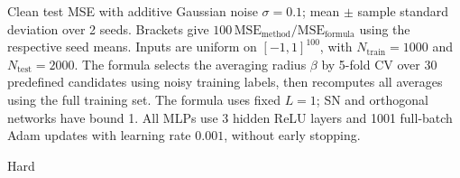 \begin{table}[t]
\centering
\footnotesize
\setlength{\tabcolsep}{3pt}
\caption{Clean test MSE with additive Gaussian noise $\sigma=0.1$; mean $\pm$ sample standard deviation over 2 seeds. Brackets give $100\,\mathrm{MSE}_{\mathrm{method}}/\mathrm{MSE}_{\mathrm{formula}}$ using the respective seed means. Inputs are uniform on $[-1,1]^{100}$, with $N_{\mathrm{train}}=1000$ and $N_{\mathrm{test}}=2000$. The formula selects the averaging radius $\beta$ by 5-fold CV over 30 predefined candidates using noisy training labels, then recomputes all averages using the full training set. The formula uses fixed $L=1$; SN and orthogonal networks have bound 1. All MLPs use 3 hidden ReLU layers and 1001 full-batch Adam updates with learning rate $0.001$, without early stopping.}
\label{tab:noisy-0p1-ratio1}
\begin{subtable}{\textwidth}
\centering
\caption{Hard}
\label{tab:noisy-0p1-ratio1-1}
\end{subtable}
\par\medskip
\begin{subtable}{\textwidth}
\centering
\caption{Tied}
\label{tab:noisy-0p1-ratio1-2}
\end{subtable}
\end{table}
